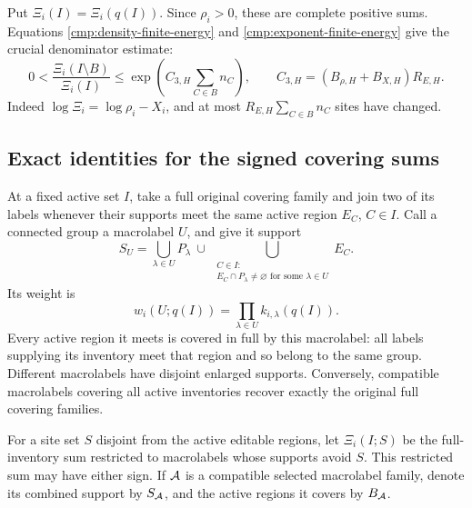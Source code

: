 Put \(\Xi_i(I)=\Xi_i(q(I))\).  Since \(\rho_i>0\), these are complete
positive sums.  Equations \eqref{cmp:density-finite-energy} and
\eqref{cmp:exponent-finite-energy} give the crucial denominator estimate:
\begin{equation}
 0<\frac{\Xi_i(I\setminus B)}{\Xi_i(I)}
 \le
 \exp\!\left(C_{3,H}\sum_{C\in B}n_C\right),
 \qquad
 C_{3,H}=(B_{\rho,H}+B_{X,H})R_{E,H}.
 \label{cmp:complete-ratio}
\end{equation}
Indeed \(\log\Xi_i=\log\rho_i-X_i\), and at most
\(R_{E,H}\sum_{C\in B}n_C\) sites have changed.

\subsection{Exact identities for the signed covering sums}

At a fixed active set \(I\), take a full original covering family and
join two of its labels whenever their supports meet the same active
region \(E_C\), \(C\in I\).  Call a connected group a macrolabel \(U\),
and give it support
\begin{equation}
 S_U=\bigcup_{\lambda\in U}P_\lambda
       \ \cup\
       \bigcup_{\substack{C\in I:\\
                    E_C\cap P_\lambda\ne\varnothing
                    \text{ for some }\lambda\in U}}E_C.
 \label{cmp:macro-support}
\end{equation}
Its weight is
\[
 w_i(U;q(I))=\prod_{\lambda\in U}k_{i,\lambda}(q(I)).
 \label{cmp:macro-weight}
\]
Every active region it meets is covered in full by this macrolabel:
all labels supplying its inventory meet that region and so belong to
the same group.  Different macrolabels have disjoint enlarged supports.
Conversely, compatible macrolabels covering all active inventories
recover exactly the original full covering families.

For a site set \(S\) disjoint from the active editable regions, let
\(\Xi_i(I;S)\) be the full-inventory sum restricted to macrolabels whose
supports avoid \(S\).  This restricted sum may have either sign.  If
\({\cal A}\) is a compatible selected macrolabel family, denote its
combined support by \(S_{\cal A}\), and the active regions it covers by
\(B_{\cal A}\).

